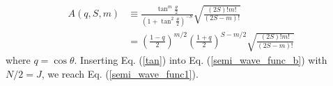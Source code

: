 \documentclass[%
superscriptaddress,
preprint,
showpacs,
nofootinbib,
amsmath,amssymb,
aps,
prc,
floatfix ]%
{revtex4-1}
\begin{document}
\begin{align}
  A(q,S,m) &\equiv 
  \frac{\tan^m{\frac{\theta}{2}}}{\left(1+\tan^2{\frac{\theta}{2}}\right)^{-S}}
  \sqrt{\frac{(2S)!m!}{(2S-m)!}}  \nonumber \\
  &= \left(\frac{1-q}{2}\right)^{m/2}\left(\frac{1+q}{2}\right)^{S-m/2} \sqrt{\frac{(2S)!m!}{(2S-m)!}}
\label{tan}
\end{align}
where $q=\cos{\theta}$.
Inserting Eq. (\ref{tan}) into Eq. (\ref{semi_wave_func_b}) with $N/2=J$,
we reach Eq. (\ref{semi_wave_func1}).



\end{document}

